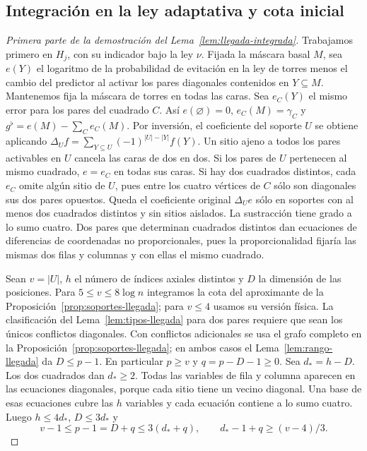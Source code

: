 \subsection{Integración en la ley adaptativa y cota inicial}
\begin{proof}[Primera parte de la demostración del Lema~\ref{lem:llegada-integrada}]
Trabajamos primero en \(H_j\), con su indicador bajo la ley \(\nu\). Fijada la máscara basal
\(M\), sea \(e(Y)\) el logaritmo de la probabilidad de evitación en la ley de torres menos
el cambio del predictor al activar los pares diagonales contenidos en \(Y\subseteq M\).
Mantenemos fija la máscara de torres en todas las caras. Sea \(e_C(Y)\) el mismo error para
los pares del cuadrado \(C\). Así \(e(\varnothing)=0\), \(e_C(M)=\gamma_C\) y
\(g^\flat=e(M)-\sum_C e_C(M)\). Por inversión, el coeficiente del soporte \(U\) se obtiene
aplicando \(\Delta_U f=\sum_{Y\subseteq U}(-1)^{|U|-|Y|}f(Y)\).
Un sitio ajeno a todos los pares activables en \(U\) cancela las caras de dos en dos.
Si los pares de \(U\) pertenecen al mismo cuadrado, \(e=e_C\) en todas sus caras. Si hay dos
cuadrados distintos, cada \(e_C\) omite algún sitio de \(U\), pues entre los cuatro vértices de
\(C\) sólo son diagonales sus dos pares opuestos. Queda el coeficiente original \(\Delta_U e\)
sólo en soportes con al menos dos cuadrados distintos y sin sitios aislados. La sustracción tiene
grado a lo sumo cuatro. Dos pares que determinan cuadrados distintos dan ecuaciones de
diferencias de coordenadas no proporcionales, pues la proporcionalidad fijaría las mismas dos
filas y columnas y con ellas el mismo cuadrado.

Sean \(v=|U|\), \(h\) el número de índices axiales distintos y \(D\) la dimensión
de las posiciones. Para \(5\le v\le8\log n\) integramos la cota del aproximante
de la Proposición~\ref{prop:soportes-llegada}; para \(v\le4\) usamos su versión física.
La clasificación del Lema~\ref{lem:tipos-llegada} para dos pares requiere que sean los
únicos conflictos diagonales. Con conflictos adicionales se usa el grafo completo en la
Proposición~\ref{prop:soportes-llegada}; en ambos casos el Lema~\ref{lem:rango-llegada}
da \(D\le p-1\).
En particular \(p\ge v\) y \(q=p-D-1\ge0\). Sea \(d_*=h-D\). Los dos cuadrados dan
\(d_*\ge2\). Todas las variables de fila y columna aparecen en las ecuaciones diagonales,
porque cada sitio tiene un vecino diagonal. Una base de esas ecuaciones cubre las \(h\)
variables y cada ecuación contiene a lo sumo cuatro. Luego \(h\le4d_*\), \(D\le3d_*\) y
\[
 v-1\le p-1=D+q\le3(d_*+q),\qquad d_*-1+q\ge(v-4)/3 .
\]


\end{proof}
